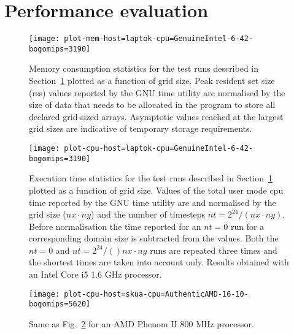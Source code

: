\documentclass[final,5p,times,twocolumn]{elsarticle}
\begin{document}
  \section{Performance evaluation}\label{sec:perf}

  \begin{figure}
    \center
    \texttt{[image: plot-mem-host=laptok-cpu=GenuineIntel-6-42-bogomips=3190]}
    \caption{\label{fig:mem}
      Memory consumption statistics for the test runs described in Section~\ref{sec:perf}
        plotted as a function of grid size.
      Peak resident set size (rss) values reported by the GNU time utility are normalised by the size of
        data that needs to be allocated in the program to store all declared grid-sized arrays.
      Asymptotic values reached at the largest grid sizes are indicative 
        of temporary storage requirements.
    }
  \end{figure}
  \begin{figure}
    \center
    \texttt{[image: plot-cpu-host=laptok-cpu=GenuineIntel-6-42-bogomips=3190]}
    \caption{\label{fig:cpu-eyrie}
      Execution time statistics for the test runs described in Section~\ref{sec:perf}
        plotted as a function of grid size.
      Values of the total user mode cpu time reported by the GNU time utility are
        and normalised by the grid size ($nx \cdot ny$) and the number of timesteps $nt=2^{24}/(nx \cdot ny)$.
      Before normalisation the time reported for an $nt=0$ run for a corresponding
        domain size is subtracted from the values.
      Both the $nt=0$ and $nt=2^{24}/()nx \cdot ny$ runs are repeated three times and
        the shortest times are taken into account only.
      Results obtained with an Intel\textsuperscript{\textregistered} 
        Core\textsuperscript{\texttrademark} i5 1.6 GHz processor.
    }
  \end{figure}
  \begin{figure}
    \center
    \texttt{[image: plot-cpu-host=skua-cpu=AuthenticAMD-16-10-bogomips=5620]}
    \caption{\label{fig:cpu-skua}
      Same as Fig.~\ref{fig:cpu-eyrie} for an AMD Phenom\textsuperscript{\texttrademark} II 800 MHz processor.
    }
  \end{figure}
\end{document}
